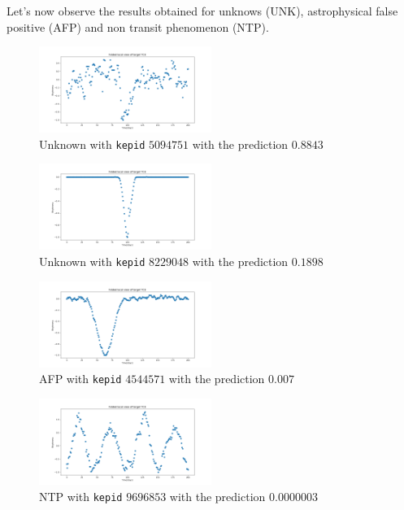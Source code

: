 \documentclass[twoside]{article}
\newcommand{\code}[1]{\texttt{#1}}
\begin{document}
\begin{multicols}{2}
Let's now observe the results obtained for unknows (UNK), astrophysical false positive (AFP) and non transit phenomenon (NTP).  
\begin{figure}[H]
\includegraphics[width=0.5\textwidth]{resUNK1}
\caption{Unknown with \code{kepid} $5094751$ with the prediction $0.8843$}
\label{fig:resUNK1}
\end{figure}

\begin{figure}[H]
\includegraphics[width=0.5\textwidth]{resUNK2}
\caption{Unknown with \code{kepid} $8229048$ with the prediction $0.1898$}
\label{fig:resUNK2}
\end{figure}

\begin{figure}[H]
\includegraphics[width=0.5\textwidth]{resAFP}
\caption{AFP with \code{kepid} $4544571$ with the prediction $0.007$}
\label{fig:resAFP}
\end{figure}

\begin{figure}[H]
\includegraphics[width=0.5\textwidth]{resNTP}
\caption{NTP with \code{kepid} $9696853$ with the prediction $0.0000003$}
\label{fig:resAFP}
\end{figure}


\end{multicols}
\end{document}
